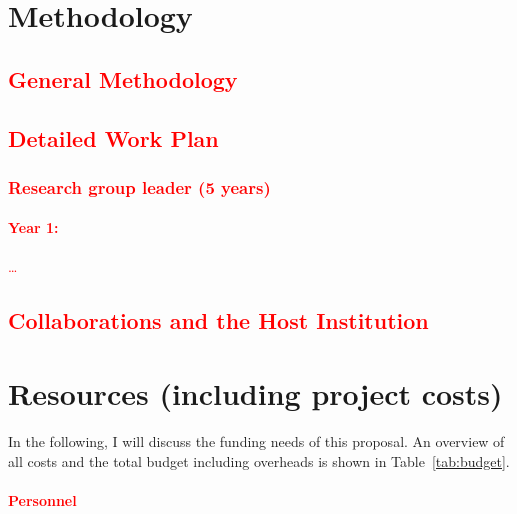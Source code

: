 \section{Methodology}
\textcolor{red}{\blindtext[5]}

\subsection*{\textcolor{red}{General Methodology}}

\textcolor{red}{\blindtext[2]}

\subsection*{\textcolor{red}{Detailed Work Plan}}

\subsubsection{\textcolor{red}{Research group leader (5 years)}}

\paragraph*{\textcolor{red}{Year 1:}} \textcolor{red}{\blindtext[5]}

\textcolor{red}{\ldots}

\subsection*{\textcolor{red}{Collaborations and the Host Institution}}

\textcolor{red}{\blindtext[2]}



\section{Resources (including project costs)}\label{sec:budget}
In the following, I will discuss the funding needs of this proposal. An overview of all costs and
the total budget including overheads is shown in Table~\ref{tab:budget}.

\paragraph{\textcolor{red}{Personnel}}

